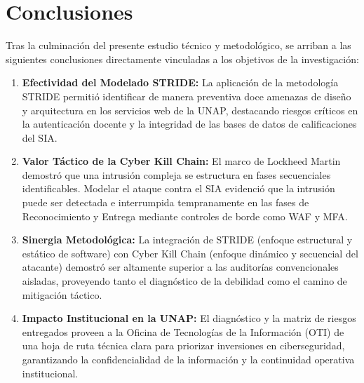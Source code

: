 \chapter{Conclusiones}
\label{ch:conclusiones}

Tras la culminación del presente estudio técnico y metodológico, se arriban a las siguientes conclusiones directamente vinculadas a los objetivos de la investigación:

\begin{enumerate}
    \item \textbf{Efectividad del Modelado STRIDE:} La aplicación de la metodología STRIDE permitió identificar de manera preventiva doce amenazas de diseño y arquitectura en los servicios web de la UNAP, destacando riesgos críticos en la autenticación docente y la integridad de las bases de datos de calificaciones del SIA.
    \item \textbf{Valor Táctico de la Cyber Kill Chain:} El marco de Lockheed Martin demostró que una intrusión compleja se estructura en fases secuenciales identificables. Modelar el ataque contra el SIA evidenció que la intrusión puede ser detectada e interrumpida tempranamente en las fases de Reconocimiento y Entrega mediante controles de borde como WAF y MFA.
    \item \textbf{Sinergia Metodológica:} La integración de STRIDE (enfoque estructural y estático de software) con Cyber Kill Chain (enfoque dinámico y secuencial del atacante) demostró ser altamente superior a las auditorías convencionales aisladas, proveyendo tanto el diagnóstico de la debilidad como el camino de mitigación táctico.
    \item \textbf{Impacto Institucional en la UNAP:} El diagnóstico y la matriz de riesgos entregados proveen a la Oficina de Tecnologías de la Información (OTI) de una hoja de ruta técnica clara para priorizar inversiones en ciberseguridad, garantizando la confidencialidad de la información y la continuidad operativa institucional.
\end{enumerate}
